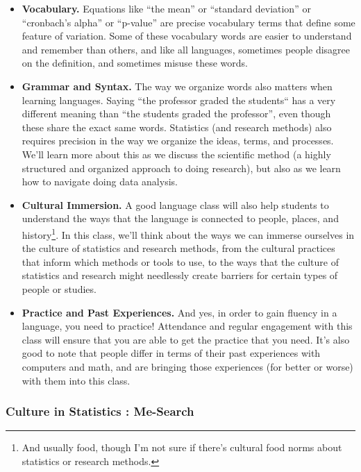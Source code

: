 \documentclass[
  letterpaper,
  DIV=11,
  numbers=noendperiod,
  oneside]{scrreprt}
\begin{document}
\begin{itemize}
\item
  \textbf{Vocabulary.} Equations like ``the mean'' or ``standard
  deviation'' or ``cronbach's alpha'' or ``p-value'' are precise
  vocabulary terms that define some feature of variation. Some of these
  vocabulary words are easier to understand and remember than others,
  and like all languages, sometimes people disagree on the definition,
  and sometimes misuse these words.
\item
  \textbf{Grammar and Syntax.} The way we organize words also matters
  when learning languages. Saying ``the professor graded the students``
  has a very different meaning than ``the students graded the
  professor'', even though these share the exact same words. Statistics
  (and research methods) also requires precision in the way we organize
  the ideas, terms, and processes. We'll learn more about this as we
  discuss the scientific method (a highly structured and organized
  approach to doing research), but also as we learn how to navigate
  doing data analysis.
\item
  \textbf{Cultural Immersion.} A good language class will also help
  students to understand the ways that the language is connected to
  people, places, and history\footnote{And usually food, though I'm not
    sure if there's cultural food norms about statistics or research
    methods.}. In this class, we'll think about the ways we can immerse
  ourselves in the culture of statistics and research methods, from the
  cultural practices that inform which methods or tools to use, to the
  ways that the culture of statistics and research might needlessly
  create barriers for certain types of people or studies.
\item
  \textbf{Practice and Past Experiences.} And yes, in order to gain
  fluency in a language, you need to practice! Attendance and regular
  engagement with this class will ensure that you are able to get the
  practice that you need. It's also good to note that people differ in
  terms of their past experiences with computers and math, and are
  bringing those experiences (for better or worse) with them into this
  class.
\end{itemize}

\subsubsection{Culture in Statistics :
Me-Search}\label{culture-in-statistics-me-search}
\end{document}
